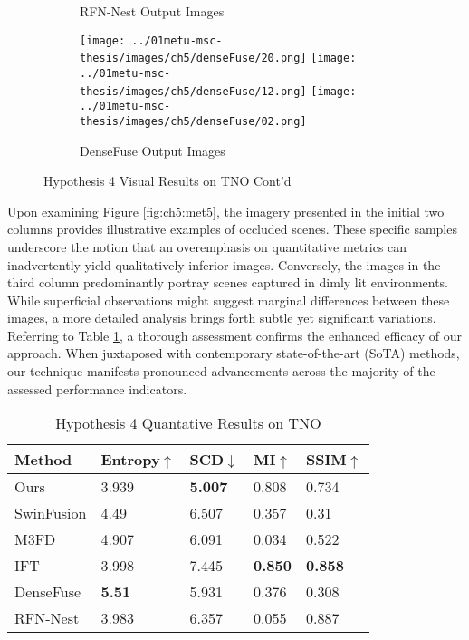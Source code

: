 \begin{figure}[htbp]
\begin{subfigure}[b]{\textwidth}
        \caption{RFN-Nest\cite{li2021rfn} Output Images}
        \label{fig:ch5:met5:rfn}
    \end{subfigure}
    \vspace{0.01cm}
    \begin{subfigure}[b]{\textwidth}
        \texttt{[image: ../01metu-msc-thesis/images/ch5/denseFuse/20.png]}
        \texttt{[image: ../01metu-msc-thesis/images/ch5/denseFuse/12.png]}
        \texttt{[image: ../01metu-msc-thesis/images/ch5/denseFuse/02.png]}
        \caption{DenseFuse\cite{li2019infrared} Output Images}
        \label{fig:ch5:met5:densefuse}
    \end{subfigure}
    \caption{Hypothesis 4 Visual Results on TNO Cont'd}
\end{figure}

Upon examining Figure \ref{fig:ch5:met5}, the imagery presented in the initial two columns provides illustrative examples of occluded scenes. These specific samples underscore the notion that an overemphasis on quantitative metrics can inadvertently yield qualitatively inferior images. Conversely, the images in the third column predominantly portray scenes captured in dimly lit environments. While superficial observations might suggest marginal differences between these images, a more detailed analysis brings forth subtle yet significant variations. Referring to Table \ref{tab:ch5:met5}, a thorough assessment confirms the enhanced efficacy of our approach. When juxtaposed with contemporary state-of-the-art (SoTA) methods, our technique manifests pronounced advancements across the majority of the assessed performance indicators.

\begin{table}[htbp]
    \centering
    \caption{Hypothesis 4 Quantative Results on TNO}
    \label{tab:ch5:met5}
    \begin{tabular}{|l|l|l|l|l|}
        \hline
        \textbf{Method} & \textbf{Entropy\cite{roberts2008assessment}$\uparrow$ } & \textbf{SCD\cite{aslantas2015new}$\downarrow$} & \textbf{MI\cite{qu2002information}$\uparrow$} & \textbf{SSIM\cite{ma2015perceptual}$\uparrow$} \\ \hline
        Ours & 3.939 & \textbf{5.007} & 0.808 & 0.734 \\ \hline
        SwinFusion\cite{ma2022swinfusion} & 4.49 & 6.507 & 0.357 & 0.31 \\ \hline
        M3FD\cite{liu2022target} & 4.907 & 6.091 & 0.034 & 0.522 \\ \hline
        IFT\cite{vs2022image} & 3.998 & 7.445 & \textbf{0.850} & \textbf{0.858} \\ \hline
        DenseFuse\cite{li2019infrared} & \textbf{5.51} & 5.931 & 0.376 & 0.308 \\ \hline
        RFN-Nest\cite{li2021rfn}& 3.983 & 6.357 & 0.055 & 0.887 \\ \hline
    \end{tabular}
\end{table}

